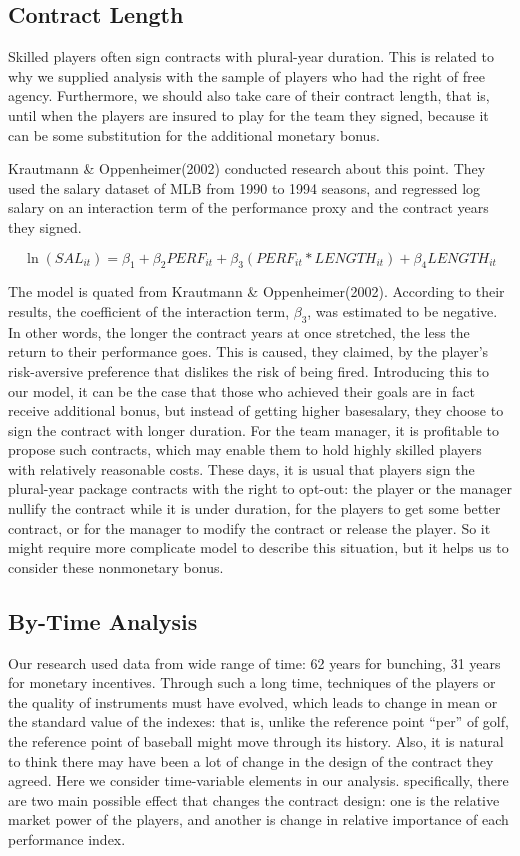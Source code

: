 \documentclass[dvipdfmx, 12pt]{article}
\begin{document}
\subsection{Contract Length}

Skilled players often sign contracts with plural-year duration. This is related to why we supplied analysis with the sample of players who had the right of free agency. Furthermore, we should also take care of their contract length, that is, until when the players are insured to play for the team they signed, because it can be some substitution for the additional monetary bonus.

Krautmann \& Oppenheimer(2002) conducted research about this point. They used the salary dataset of MLB from 1990 to 1994 seasons, and regressed log salary on an interaction term of the performance proxy and the contract years they signed.

\[
\ln(SAL_{it}) = \beta_1 + \beta_2 PERF_{it} + \beta_3 (PERF_{it} * LENGTH_{it})+ \beta_4 LENGTH_{it}
\]

The model is quated from Krautmann \& Oppenheimer(2002). According to their results, the coefficient of the interaction term, $\beta_3$, was estimated to be negative. In other words, the longer the contract years at once stretched, the less the return to their performance goes. This is caused, they claimed, by the player's risk-aversive preference that dislikes the risk of being fired. Introducing this to our model, it can be the case that those who achieved their goals are in fact receive additional bonus, but instead of getting higher basesalary, they choose to sign the contract with longer duration. For the team manager, it is profitable to propose such contracts, which may enable them to hold highly skilled players with relatively reasonable costs. These days, it is usual that players sign the plural-year package contracts with the right to opt-out: the player or the manager nullify the contract while it is under duration, for the players to get some better contract, or for the manager to modify the contract or release the player. So it might require more complicate model to describe this situation, but it helps us to consider these nonmonetary bonus.

\subsection{By-Time Analysis}

Our research used data from wide range of time: 62 years for bunching, 31 years for monetary incentives. Through such a long time, techniques of the players or the quality of instruments must have evolved, which leads to change in mean or the standard value of the indexes: that is, unlike the reference point ``per'' of golf, the reference point of baseball might move through its history. Also, it is natural to think there may have been a lot of change in the design of the contract they agreed. Here we consider time-variable elements in our analysis. specifically, there are two main possible effect that changes the contract design: one is the relative market power of the players, and another is change in relative importance of each performance index.
\end{document}
